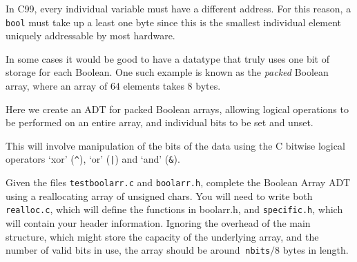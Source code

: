 
In C99, every individual variable must have a different address. For
this reason, a \verb^bool^ must take up a least one byte since this is
the smallest individual element uniquely addressable by most hardware.

In some cases it would be good to have a datatype that truly uses one bit
of storage for each Boolean. One such example is known as the  {\it packed}
Boolean array, where an array of $64$ elements takes $8$ bytes.

Here we create an ADT for packed Boolean arrays, allowing logical
operations to be performed on an entire array, and individual bits to
be set and unset.

\noindent
This will involve manipulation of the bits of the data
using the C bitwise logical operators `xor' (\verb#^#), `or' (\verb^|^) and `and' (\verb^&^).

\begin{exercise}
Given the files \verb^testboolarr.c^ and \verb^boolarr.h^, complete the Boolean Array ADT using
a reallocating array of unsigned chars. You will need to write both \verb^realloc.c^, which will define the 
functions in boolarr.h, and \verb^specific.h^, which will contain your header information. 
Ignoring the overhead of the main structure, 
which might store the capacity of the underlying array, and the number of valid bits in use, 
the array should be around $~$\verb^nbits^$/8$ bytes in length.
\end{exercise}
